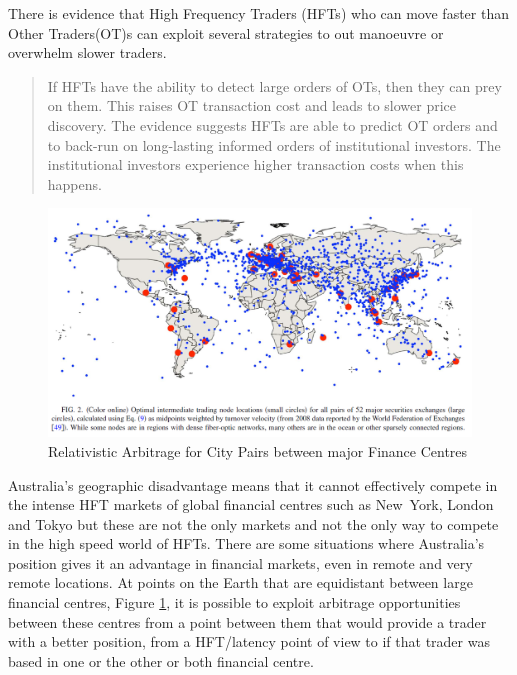 There is evidence that High Frequency Traders (HFTs) who can move faster than Other Traders(OT)s can exploit several strategies to out manoeuvre or overwhelm slower traders.

\begin{quotation}
If HFTs have the ability to detect large orders of OTs, then they can prey
on them. This raises OT transaction cost and leads to slower price discovery. The evidence
suggests HFTs are able to predict OT orders and to back-run on long-lasting informed orders of
institutional investors. The institutional investors experience higher transaction costs when this
happens\cite[p12]{RefWorks:280}.
\end{quotation}

\begin{figure}
\centering
\includegraphics[scale=0.5]{figures/RelativisticStatisticalArbitrage.png}
\caption{Relativistic Arbitrage for City Pairs between major Finance Centres\cite{RefWorks:281}}
\label{relativistic}
\end{figure}

Australia's geographic disadvantage means that it cannot effectively compete in the intense HFT markets of global financial centres such as New~York, London and Tokyo but these are not the only markets and not the only way to compete in the high speed world of HFTs. There are some situations where Australia's position gives it an advantage in financial markets, even in remote and very remote locations. At points on the Earth that are equidistant between large financial centres, Figure \ref{relativistic}, it is possible to exploit arbitrage opportunities between these centres from a point between them that would provide a trader with a better position, from a HFT/latency point of view to if that trader was based in one or the other or both financial centre.

